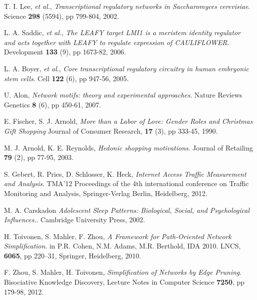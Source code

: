 \begin{thebibliography}{99}
  T. I. Lee, \textit{et al.},
  \emph{Transcriptional regulatory networks in Saccharomyces cerevisiae}.
  Science \textbf{298} (5594), pp 799-804,
  2002.

  L. A. Saddic, \textit{et al.},
  \emph{The LEAFY target LMI1 is a meristem identity regulator and acts together with LEAFY to regulate expression of CAULIFLOWER}.
  Development \textbf{133} (9), pp 1673-82,
  2006.

  L. A. Boyer, \textit{et al.},
  \emph{Core transcriptional regulatory circuitry in human embryonic stem cells}.
  Cell \textbf{122} (6), pp 947-56,
  2005.

  U. Alon,
  \emph{Network motifs: theory and experimental approaches}.
  Nature Reviews Genetics \textbf{8} (6), pp 450-61,
  2007.
  
  E. Fischer, S. J. Arnold,
  \emph{More than a Labor of Love: Gender Roles and Christmas Gift Shopping}
  Journal of Consumer Research, \textbf{17} (3), pp 333-45,
  1990.

  M. J. Arnold, K. E. Reynolds,
  \emph{Hedonic shopping motivations}.
  Journal of Retailing \textbf{79} (2), pp 77-95,
  2003.

  S. Gebert, R. Pries, D. Schlosser, K. Heck,
  \emph{Internet Access Traffic Measurement and Analysis}.
  TMA'12 Proceedings of the 4th international conference on Traffic Monitoring and Analysis,
  Springer-Verlag Berlin, Heidelberg,
  2012.

  M. A. Carskadon
  \emph{Adolescent Sleep Patterns: Biological, Social, and Psychological Influences.}.
  Cambridge University Press,
  2002.

  H. Toivonen, S. Mahler, F. Zhou,
  \emph{A Framework for Path-Oriented Network Simplification}.
  in P.R. Cohen, N.M. Adams, M.R. Berthold,
  IDA 2010. LNCS, \textbf{6065}, pp 220–31,
  Springer, Heidelberg,
  2010.

  F. Zhou, S. Mahler, H. Toivonen,
  \emph{Simplification of Networks by Edge Pruning}.
  Bisociative Knowledge Discovery,
  Lecture Notes in Computer Science \textbf{7250}, pp 179-98,
  2012.

\end{thebibliography}
